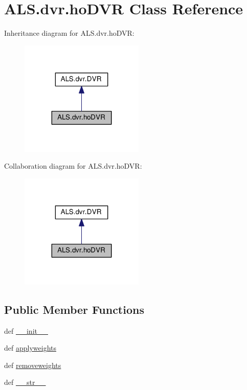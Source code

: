 \hypertarget{class_a_l_s_1_1dvr_1_1ho_d_v_r}{\section{A\+L\+S.\+dvr.\+ho\+D\+V\+R Class Reference}
\label{class_a_l_s_1_1dvr_1_1ho_d_v_r}
}


Inheritance diagram for A\+L\+S.\+dvr.\+ho\+D\+V\+R\+:
\nopagebreak
\begin{figure}[H]
\begin{center}
\leavevmode
\includegraphics[width=167pt]{class_a_l_s_1_1dvr_1_1ho_d_v_r__inherit__graph}
\end{center}
\end{figure}


Collaboration diagram for A\+L\+S.\+dvr.\+ho\+D\+V\+R\+:
\nopagebreak
\begin{figure}[H]
\begin{center}
\leavevmode
\includegraphics[width=167pt]{class_a_l_s_1_1dvr_1_1ho_d_v_r__coll__graph}
\end{center}
\end{figure}
\subsection*{Public Member Functions}
\begin{DoxyCompactItemize}
\item 
def \hyperlink{class_a_l_s_1_1dvr_1_1ho_d_v_r_ab7b08569820e0c8a0d3563b4d3fad700}{\+\_\+\+\_\+init\+\_\+\+\_\+}
\item 
def \hyperlink{class_a_l_s_1_1dvr_1_1ho_d_v_r_ad5e0788479aae3409e5b27e9f40a589a}{applyweights}
\item 
def \hyperlink{class_a_l_s_1_1dvr_1_1ho_d_v_r_acf13d890d53b0519798b380aecd5e423}{removeweights}
\item 
def \hyperlink{class_a_l_s_1_1dvr_1_1ho_d_v_r_ab68d82e7f453fb5cc392e21a7f89fa62}{\+\_\+\+\_\+str\+\_\+\+\_\+}
\end{DoxyCompactItemize}
